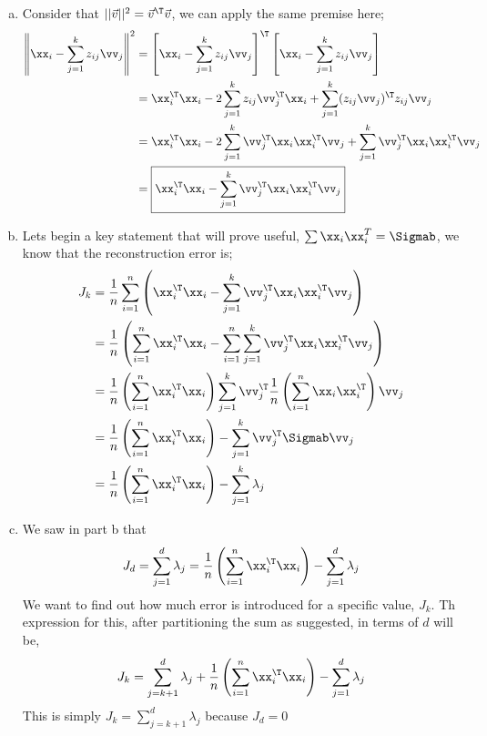 \documentclass[12pt,letterpaper,fleqn]{hmcpset}
\begin{document}
\begin{solution}
\begin{enumerate}[(a)]
\item Consider that $|| \vec{v}||^2 = \vec{v}^\T \vec{v}$, we can apply the same premise here;  
\begin{align*}
 \left\|\xx_i - \sum_{j=1}^k z_{ij}\vv_j\right\|^2 &= \left[\xx_i - \sum_{j=1}^k z_{ij}\vv_j\right]^\T \left[\xx_i - \sum_{j=1}^k z_{ij}\vv_j\right] \\ 
 &= \xx_i^\T\xx_i -2\sum_{j=1}^k z_{ij}\vv_j^\T \xx_i+ \sum_{j=1}^k (z_{ij} \vv_j)^\T z_{ij} \vv_j\\
 &= \xx_i^\T\xx_i -2\sum_{j=1}^k \vv_j^\T \xx_i\xx_i^\T\vv_j +\sum_{j=1}^k \vv_j^\T \xx_i \xx_i^\T \vv_j\\
  &=\boxed{ \xx_i^\T\xx_i -\sum_{j=1}^k \vv_j^\T \xx_i \xx_i^\T \vv_j}\\
 \end{align*}
\item Lets begin a key statement that will prove useful, $\sum \xx_i \xx_i^T = \Sigmab$, we know that the reconstruction error is; 
\begin{align*}
 J_k &= \frac{1}{n}\sum_{i=1}^n \left(\xx_i^\T \xx_i - \sum_{j=1}^k\vv_j^\T \xx_i\xx_i^\T \vv_j\right)\\
 &=\frac{1}{n} \left(\sum_{i=1}^n \xx_i^\T \xx_i - \sum_{i=1}^n  \sum_{j=1}^k\vv_j^\T \xx_i\xx_i^\T \vv_j \right)\\
 &= \frac{1}{n} \left(\sum_{i=1}^n \xx_i^\T \xx_i  \right)\-  \sum_{j=1}^k\vv_j^\T\frac{1}{n} \left(\sum_{i=1}^n \xx_i\xx_i^\T \right)\vv_j\\
  &= \frac{1}{n} \left(\sum_{i=1}^n \xx_i^\T \xx_i\right) -  \sum_{j=1}^k\vv_j^\T \Sigmab \vv_j \\
  &= \frac{1}{n} \left(\sum_{i=1}^n \xx_i^\T \xx_i\right) -  \sum_{j=1}^k\lambda_j
\end{align*}
\item We saw in part b that $$J_d = \sum_{j=1}^d \lambda_j= \frac{1}{n} \left(\sum_{i=1}^n \xx_i^\T \xx_i\right) -  \sum_{j=1}^d\lambda_j $$ We want to find out how much error is introduced for a specific value, $J_k$. Th expression for this, after partitioning the sum as suggested, in terms of $d$ will be, 
$$J_k=   \sum_{j=k+1}^d\lambda_j +\frac{1}{n} \left(\sum_{i=1}^n \xx_i^\T \xx_i\right) - \sum_{j=1}^d\lambda_j $$
This is simply $J_k =   \sum_{j=k+1}^d\lambda_j$ because $J_d = 0$
\end{enumerate}
\end{solution}
\newpage
\end{document}
